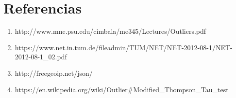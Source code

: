 \section{Referencias}

\begin{enumerate}
\item http://www.mne.psu.edu/cimbala/me345/Lectures/Outliers.pdf
\item https://www.net.in.tum.de/fileadmin/TUM/NET/NET-2012-08-1/NET-2012-08-1_02.pdf
\item http://freegeoip.net/json/
\item https://en.wikipedia.org/wiki/Outlier#Modified_Thompson_Tau_test
\end{enumerate}

